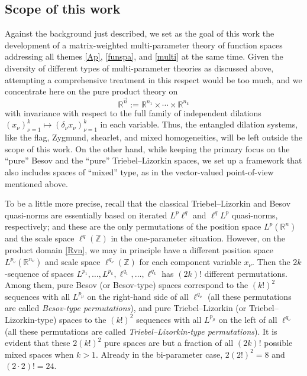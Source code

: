\documentclass[11pt, reqno]{amsart}
\theoremstyle{definition}
\theoremstyle{remark}
\numberwithin{equation}{section}
\newcommand{\R}{\mathbb R}
\newcommand{\Z}{\mathbb Z}
\newcommand{\vn}{\vec n}
\begin{document}
\subsection{Scope of this work}

Against the background just described, we set as the goal of this work the development of a matrix-weighted multi-parameter theory of function spaces addressing all themes \eqref{Ap}, \eqref{funspa}, and \eqref{multi}
at the same time. Given the diversity of different types of multi-parameter
theories as discussed above, attempting a comprehensive treatment in this
respect would be too much, and we concentrate here on the pure product theory on
\begin{equation}\label{Rvn}
\R^{\vn}:=\R^{n_1}\times\cdots\times\R^{n_k}
\end{equation}
with invariance with respect to the full family of independent dilations $(x_\nu)_{\nu=1}^k\mapsto(\delta_\nu x_\nu)_{\nu=1}^k$ in each variable.
Thus, the entangled dilation systems, like the flag, Zygmund, shearlet,
and mixed homogeneities, will be left outside the scope of this work.
On the other hand, while keeping the primary focus on the ``pure'' Besov
and the ``pure'' Triebel--Lizorkin spaces, we set up a framework that also includes
spaces of ``mixed'' type, as in the vector-valued point-of-view mentioned above.

To be a little more precise, recall that the classical Triebel--Lizorkin and Besov quasi-norms are essentially based on iterated $L^p\ell^q$ and $\ell^qL^p$ quasi-norms, respectively;
and these are the only permutations of the position space $L^p(\R^n)$
and the scale space $\ell^q(\Z)$ in the one-parameter situation.
However, on the product domain \eqref{Rvn}, we may in principle
have a different position space $L^{p_\nu}(\R^{n_\nu})$ and scale
space $\ell^{q_\nu}(\Z)$ for each component variable $x_{\nu}$.
Then the $2k$-sequence of spaces $L^{p_1},\ldots,L^{p_k},\ell^{q_1},
\ldots,\ell^{q_k}$ has $(2k)!$ different permutations. Among them, pure Besov
(or Besov-type) spaces
correspond to the $(k!)^2$ sequences with all $L^{p_\mu}$ on the right-hand side of
all $\ell^{q_\nu}$ (all these permutations
are called \emph{Besov-type permutations}), and pure Triebel--Lizorkin
(or Triebel--Lizorkin-type) spaces to the $(k!)^2$
sequences with all $L^{p_\mu}$ on the left of all $\ell^{q_\nu}$
(all these permutations are called \emph{Triebel--Lizorkin-type permutations}).
It is evident that these $2(k!)^2$ pure spaces are but a fraction of all $(2k)!$
possible mixed spaces when $k>1$. Already in the bi-parameter case, $2(2!)^2=8$
and $(2\cdot 2)!=24$.
\end{document}
